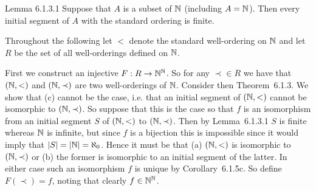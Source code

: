 \begin{solution}
    \begin{statement}{Lemma 6.1.3.1}
        Suppose that $A$ is a subset of $\mathbb{N}$ (including $A = \mathbb{N}$).
        Then every initial segment of $A$ with the standard ordering is finite.
    \end{statement}


    \mainprob

    Throughout the following let $<$ denote the standard well-ordering on $\mathbb{N}$ and let $R$ be the set of all well-orderings defined on $\mathbb{N}$.

    First we construct an injective $F: R \to \mathbb{N}^{\mathbb{N}}$.
    So for any $\prec \in R$ we have that $(\mathbb{N}, <)$ and $(\mathbb{N}, \prec)$ are two well-orderings of $\mathbb{N}$.
    Consider then Theorem~6.1.3.
    We show that (c) cannot be the case, i.e. that an initial segment of $(\mathbb{N}, <)$ cannot be isomorphic to $(\mathbb{N}, \prec)$.
    So suppose that this is the case so that $f$ is an isomorphism from an initial segment $S$ of $(\mathbb{N}, <)$ to $(\mathbb{N}, \prec)$.
    Then by  Lemma~6.1.3.1 $S$ is finite whereas $\mathbb{N}$ is infinite, but since $f$ is a bijection this is impossible since it would imply that $|S| = |\mathbb{N}| = {\aleph_0}$.
    Hence it must be that (a) $(\mathbb{N}, <)$ is isomorphic to $(\mathbb{N}, \prec)$ or (b) the former is isomorphic to an initial segment of the latter.
    In either case such an isomorphism $f$ is unique by Corollary~6.1.5c.
    So define $F(\prec) = f$, noting that clearly $f \in \mathbb{N}^{\mathbb{N}}$.


\end{solution}
